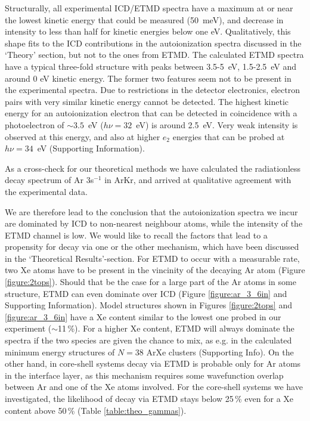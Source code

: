 Structurally, all experimental ICD/ETMD spectra have a maximum at or near the lowest kinetic energy that could be measured (50~meV), and decrease in intensity to less than half for kinetic energies below one eV. 
Qualitatively, this shape fits to the ICD contributions in the autoionization spectra discussed in the `Theory' section, but not to the ones from ETMD. 
The calculated ETMD spectra have a typical three-fold structure with peaks between 3.5-5~eV, 1.5-2.5~eV and around 0 eV kinetic energy. 
The former two features seem not to be present in the experimental spectra. 
Due to restrictions in the detector electronics, electron pairs with very similar kinetic energy cannot be detected. 
The highest kinetic energy for an autoionization electron that can be detected in coincidence with a photoelectron of $\sim3.5$~eV ($h\nu = 32$~eV) is around 2.5~eV.
Very weak intensity is observed at this energy, and also at higher $e_2$ energies that can be probed at $h\nu = 34$~eV (Supporting Information).

As a cross-check for our theoretical methods we have calculated the radiationless decay spectrum of Ar 3s$^{-1}$ in ArKr, and arrived at qualitative agreement with the experimental data.\cite{arkr}

We are therefore lead to the conclusion that the autoionization spectra we incur are dominated by ICD to non-nearest neighbour atoms, while the intensity of the ETMD channel is low. 
We would like to recall the factors that lead to a propensity for decay via one or the other mechanism, which have been discussed in the `Theoretical Results'-section.
For ETMD to occur with a measurable rate, two Xe atoms have to be present in the vincinity of the decaying Ar atom (Figure \ref{figure:2tops}).
Should that be the case for a large part of the Ar atoms in some structure, ETMD can even dominate over ICD (Figure \ref{figure:ar_3_6in} and Supporting Information).
Model structures shown in Figures \ref{figure:2tops} and \ref{figure:ar_3_6in} have a Xe content similar to the lowest one probed in our experiment ($\sim$11\,\%).
For a higher Xe content, ETMD will always dominate the spectra if the two species are given the chance to mix, as e.g. in the calculated minimum energy structures of $N=38$ ArXe clusters (Supporting Info).
On the other hand, in core-shell systems decay via ETMD is probable only for Ar atoms in the interface layer, as this mechanism requires some wavefunction overlap between Ar and one of the Xe atoms involved.
For the core-shell systems we have investigated, the likelihood of decay via ETMD stays below 25\,\% even for a Xe content above 50\,\% (Table \ref{table:theo_gammas}).

